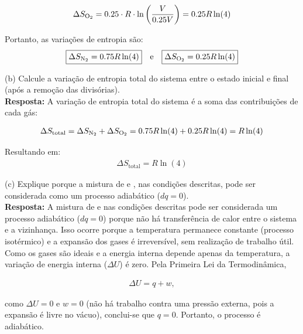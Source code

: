     \begin{align*}
    \Delta S_{\ce{O2}} = \num{0,25} \cdot R \cdot \ln\left(\frac{V}{\num{0,25}V}\right) = \num{0,25}R\ln(4)
    \end{align*}
    
    Portanto, as variações de entropia são:
    \begin{align*}
    \boxed{\Delta S_{\ce{N2}} = \num{0,75}R\ln(4)} \quad \text{e} \quad \boxed{\Delta S_{\ce{O2}} = \num{0,25}R\ln(4)}
    \end{align*}

(b) Calcule a variação de entropia total do sistema entre o estado inicial e
final (após a remoção das divisórias).\\

    \textbf{Resposta:} A variação de entropia total do sistema é a soma das contribuições de cada gás:

    \begin{align*}
    \Delta S_{\text{total}} = \Delta S_{\ce{N2}} + \Delta S_{\ce{O2}} = \num{0,75}R\ln(4) + \num{0,25}R\ln(4) = R\ln(4)
    \end{align*}
    
    Resultando em:
    \begin{align*}
    \boxed{\Delta S_{\text{total}} = R\ln(4)}
    \end{align*}

(c) Explique porque a mistura de  e , nas condições descritas,
pode ser considerada como um processo adiabático (\(dq= 0\)).\\

    \textbf{Resposta:} A mistura de  e  nas condições descritas pode 
    ser considerada um processo adiabático (\(dq = 0\)) porque não há transferência 
    de calor entre o sistema e a vizinhança. Isso ocorre porque a temperatura 
    permanece constante (processo isotérmico) e a expansão dos gases é irreversível, 
    sem realização de trabalho útil. Como os gases são ideais e a energia interna 
    depende apenas da temperatura, a variação de energia interna (\(\Delta U\)) é zero. 
    Pela Primeira Lei da Termodinâmica,

    \begin{align*}
    \Delta U = q + w,
    \end{align*}

    como \(\Delta U = 0\) e \(w = 0\) (não há trabalho contra uma pressão externa, 
    pois a expansão é livre no vácuo), conclui-se que \(q = 0\). Portanto, o processo 
    é adiabático. 

